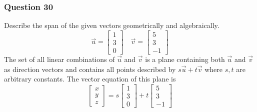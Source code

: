 \documentclass{math}
\begin{document}
\subsubsection*{Question 30}
Describe the span of the given vectors geometrically and algebraically.
\[ \vec{u} = \begin{bmatrix}1 \\ 3 \\ 0\end{bmatrix} \quad
  \vec{v} = \begin{bmatrix}5 \\ 3 \\ -1\end{bmatrix} \]
The set of all linear combinations of \( \vec{u} \) and \( \vec{v} \) is a
plane containing both \( \vec{u} \) and \( \vec{v} \) as direction vectors
and contains all points described by \( s\vec{u}+t\vec{v} \) where \( s,t \)
are arbitrary constants. The vector equation of this plane is
\[ \begin{bmatrix}x \\ y \\ z\end{bmatrix} =
  s\begin{bmatrix}1 \\ 3 \\ 0\end{bmatrix}+
  t\begin{bmatrix}5 \\ 3 \\ -1\end{bmatrix} \]
\end{document}
